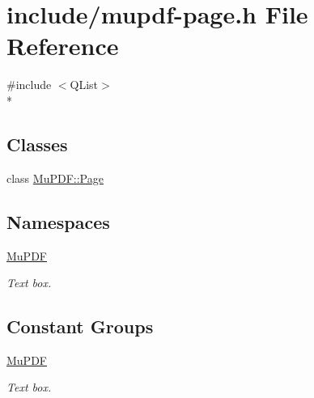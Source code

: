 \hypertarget{mupdf-page_8h}{\section{include/mupdf-\/page.h File Reference}
\label{mupdf-page_8h}
}
{\ttfamily \#include $<$Q\-List$>$}\\*
\subsection*{Classes}
\begin{DoxyCompactItemize}
\item 
class \hyperlink{class_mu_p_d_f_1_1_page}{Mu\-P\-D\-F\-::\-Page}
\end{DoxyCompactItemize}
\subsection*{Namespaces}
\begin{DoxyCompactItemize}
\item 
\hyperlink{namespace_mu_p_d_f}{Mu\-P\-D\-F}
\begin{DoxyCompactList}\small\item\em Text box. \end{DoxyCompactList}\end{DoxyCompactItemize}
\subsection*{Constant Groups}
\begin{DoxyCompactItemize}
\item 
\hyperlink{namespace_mu_p_d_f}{Mu\-P\-D\-F}
\begin{DoxyCompactList}\small\item\em Text box. \end{DoxyCompactList}\end{DoxyCompactItemize}
